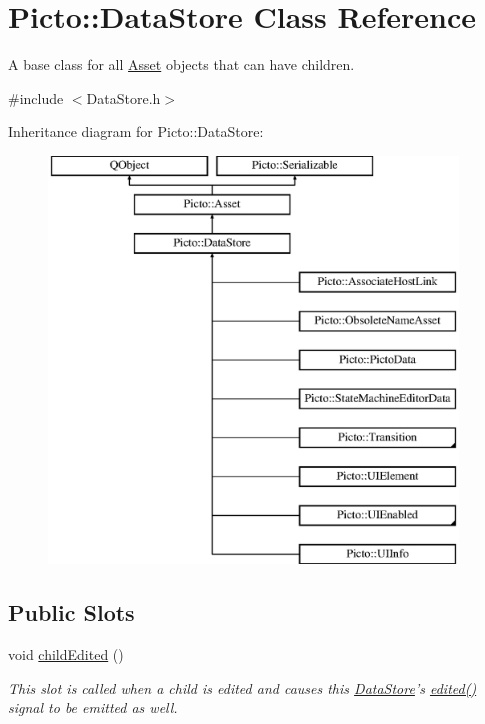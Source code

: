 \hypertarget{class_picto_1_1_data_store}{\section{Picto\-:\-:Data\-Store Class Reference}
\label{class_picto_1_1_data_store}
}


A base class for all \hyperlink{class_picto_1_1_asset}{Asset} objects that can have children.  




{\ttfamily \#include $<$Data\-Store.\-h$>$}

Inheritance diagram for Picto\-:\-:Data\-Store\-:\begin{figure}[H]
\begin{center}
\leavevmode
\includegraphics[height=10.807017cm]{class_picto_1_1_data_store}
\end{center}
\end{figure}
\subsection*{Public Slots}
\begin{DoxyCompactItemize}
\item 
\hypertarget{class_picto_1_1_data_store_a98bb6ca0be073c2537c66b82242c26aa}{void \hyperlink{class_picto_1_1_data_store_a98bb6ca0be073c2537c66b82242c26aa}{child\-Edited} ()}\label{class_picto_1_1_data_store_a98bb6ca0be073c2537c66b82242c26aa}

\begin{DoxyCompactList}\small\item\em This slot is called when a child is edited and causes this \hyperlink{class_picto_1_1_data_store}{Data\-Store}'s \hyperlink{class_picto_1_1_asset_a2ca6303bf64730a9994a180bf2227da4}{edited()} signal to be emitted as well. \end{DoxyCompactList}\end{DoxyCompactItemize}
